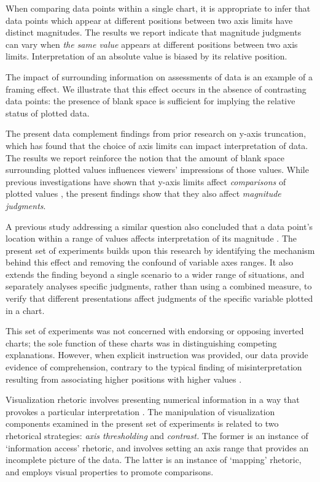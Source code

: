 \documentclass[journal]{vgtc}                %
\begin{document}
When comparing data points within a single chart, it is appropriate to
infer that data points which appear at different positions between two
axis limits have distinct magnitudes. The results we report indicate
that magnitude judgments can vary when \emph{the same value} appears at
different positions between two axis limits. Interpretation of an
absolute value is biased by its relative position.~

The impact of surrounding information on assessments of data is an
example of a framing effect. We illustrate that this effect occurs in
the absence of contrasting data points: the presence of blank space is
sufficient for implying the relative status of plotted data.

The present data complement findings from prior research on y-axis
truncation, which has found that the choice of axis limits can impact
interpretation of data. The results we report reinforce the notion that
the amount of blank space surrounding plotted values influences viewers'
impressions of those values. While previous investigations have shown
that y-axis limits affect \emph{comparisons} of plotted values
\citep{correll_truncating_2020, witt_graph_2019, yang_truncating_2021}, the
present findings show that they also affect \emph{magnitude judgments}.

A previous study addressing a similar question also concluded that a
data point's location within a range of values affects interpretation of
its magnitude \citep{sandman_high_1994}. The present set of experiments
builds upon this research by identifying the mechanism behind this
effect and removing the confound of variable axes ranges. It also
extends the finding beyond a single scenario to a wider range of
situations, and separately analyses specific judgments, rather than
using a combined measure, to verify that different presentations affect
judgments of the specific variable plotted in a chart.

This set of experiments was not concerned with endorsing or opposing
inverted charts; the sole function of these charts was in distinguishing
competing explanations. However, when explicit instruction was provided,
our data provide evidence of comprehension, contrary to the typical
finding of misinterpretation resulting from associating higher positions
with higher values \citep{woodin_conceptual_2022, pandey_how_2015}.

Visualization rhetoric involves presenting numerical information in a
way that provokes a particular interpretation
\citep{hullman_visualization_2011}. The manipulation of visualization
components examined in the present set of experiments is related to two
rhetorical strategies: \emph{axis thresholding} and \emph{contrast.} The former is
an instance of `information access' rhetoric, and involves setting an
axis range that provides an incomplete picture of the data. The latter
is an instance of `mapping' rhetoric, and employs visual properties to
promote comparisons.
\end{document}
